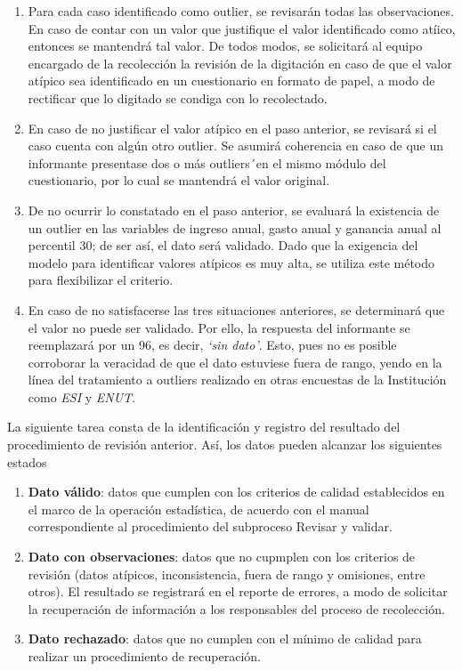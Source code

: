 \documentclass[
]{article}
\providecommand{\tightlist}{%
  \setlength{\itemsep}{0pt}\setlength{\parskip}{0pt}}
\begin{document}
\begin{enumerate}
\def\labelenumi{\arabic{enumi}.}
\item
  Para cada caso identificado como outlier, se revisarán todas las observaciones. En caso de contar con un valor que justifique el valor identificado como atíico, entonces se mantendrá tal valor. De todos modos, se solicitará al equipo encargado de la recolección la revisión de la digitación en caso de que el valor atípico sea identificado en un cuestionario en formato de papel, a modo de rectificar que lo digitado se condiga con lo recolectado.
\item
  En caso de no justificar el valor atípico en el paso anterior, se revisará si el caso cuenta con algún otro outlier. Se asumirá coherencia en caso de que un informante presentase dos o más outliers´en el mismo módulo del cuestionario, por lo cual se mantendrá el valor original.
\item
  De no ocurrir lo constatado en el paso anterior, se evaluará la existencia de un outlier en las variables de ingreso anual, gasto anual y ganancia anual al percentil 30; de ser así, el dato será validado. Dado que la exigencia del modelo para identificar valores atípicos es muy alta, se utiliza este método para flexibilizar el criterio.
\item
  En caso de no satisfacerse las tres situaciones anteriores, se determinará que el valor no puede ser validado. Por ello, la respuesta del informante se reemplazará por un 96, es decir, \emph{`sin dato'}. Esto, pues no es posible corroborar la veracidad de que el dato estuviese fuera de rango, yendo en la línea del tratamiento a outliers realizado en otras encuestas de la Institución como \emph{ESI} y \emph{ENUT}.
\end{enumerate}

La siguiente tarea consta de la identificación y registro del resultado del procedimiento de revisión anterior. Así, los datos pueden alcanzar los siguientes estados

\begin{enumerate}
\def\labelenumi{\alph{enumi})}
\tightlist
\item
  \textbf{Dato válido}: datos que cumplen con los criterios de calidad establecidos en el marco de la operación estadística, de acuerdo con el manual correspondiente al procedimiento del subproceso Revisar y validar.
\item
  \textbf{Dato con observaciones}: datos que no cupmplen con los criterios de revisión (datos atípicos, inconsistencia, fuera de rango y omisiones, entre otros). El resultado se registrará en el reporte de errores, a modo de solicitar la recuperación de información a los responsables del proceso de recolección.
\item
  \textbf{Dato rechazado}: datos que no cumplen con el mínimo de calidad para realizar un procedimiento de recuperación.
\end{enumerate}
\end{document}
